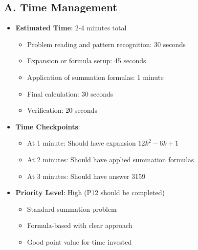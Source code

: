 \documentclass[12pt]{article}
\begin{document}
\begin{competitionbox}
\subsection*{A. Time Management}
\begin{itemize}[leftmargin=*]
    \item \textbf{Estimated Time}: 2-4 minutes total
    \begin{itemize}
        \item Problem reading and pattern recognition: 30 seconds
        \item Expansion or formula setup: 45 seconds
        \item Application of summation formulas: 1 minute
        \item Final calculation: 30 seconds
        \item Verification: 20 seconds
    \end{itemize}
    \item \textbf{Time Checkpoints}: 
    \begin{itemize}
        \item At 1 minute: Should have expansion $12k^2 - 6k + 1$
        \item At 2 minutes: Should have applied summation formulas
        \item At 3 minutes: Should have answer 3159
    \end{itemize}
    \item \textbf{Priority Level}: High (P12 should be completed)
    \begin{itemize}
        \item Standard summation problem
        \item Formula-based with clear approach
        \item Good point value for time invested
    \end{itemize}
\end{itemize}


\end{competitionbox}
\end{document}
